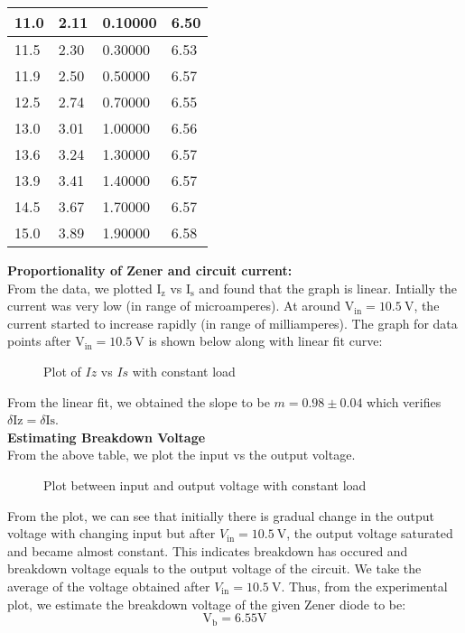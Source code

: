 \documentclass{scrartcl}
\begin{document}
\begin{longtable}{|l|l|l|l|}
        11.0     & 2.11    & 0.10000       & 6.50    \\ \hline
        11.5   & 2.30    & 0.30000       & 6.53    \\ \hline
        11.9   & 2.50    & 0.50000       & 6.57    \\ \hline
        12.5   & 2.74    & 0.70000       & 6.55    \\ \hline
        13.0     & 3.01    & 1.00000       & 6.56    \\ \hline
        13.6   & 3.24    & 1.30000       & 6.57    \\ \hline
        13.9   & 3.41    & 1.40000       & 6.57    \\ \hline
        14.5   & 3.67    & 1.70000       & 6.57    \\ \hline
        15.0     & 3.89    & 1.90000       & 6.58    \\ \hline
\end{longtable}
        
\noindent
\textbf{Proportionality of Zener and circuit current:}\\[0.3cm]
From the data, we plotted $\mathrm{I_z}$ vs $\mathrm{I_s}$ and found that the graph is linear. Intially the current was very low (in range of microamperes). At around $\mathrm{V}_{\mathrm{in}} = \SI{10.5}{\volt}$, the current started to increase rapidly (in range of milliamperes). The graph for data points after $\mathrm{V}_{\mathrm{in}} = \SI{10.5}{\volt}$ is shown below along with linear fit curve:
\begin{figure}[H]
        \centering
        
        \caption{Plot of $Iz$ vs $Is$ with constant load}
\end{figure}
\noindent
From the linear fit, we obtained the slope to be $m = 0.98\pm0.04$ which verifies $\delta \mathrm{Iz} = \delta \mathrm{Is}$.\\[0.3cm]
\textbf{Estimating Breakdown Voltage}\\[0.3cm]
From the above table, we plot the input vs the output voltage. 
\begin{figure}[H]
        \centering
        
        \caption{Plot between input and output voltage with constant load}
\end{figure}
\noindent
From the plot, we can see that initially there is gradual change in the output voltage with changing input but after $V_{\mathrm{in}} = \SI{10.5}{\volt}$, the output voltage saturated and became almost constant. This indicates breakdown has occured and breakdown voltage equals to the output voltage of the circuit.
We take the average of the voltage obtained after $V_{\mathrm{in}} = \SI{10.5}{\volt}$. Thus, from the experimental plot, we estimate the breakdown voltage of the given Zener diode to be:
$$\boxed{\mathrm{V_b} = 6.55 \mathrm{V}}$$
\end{document}
